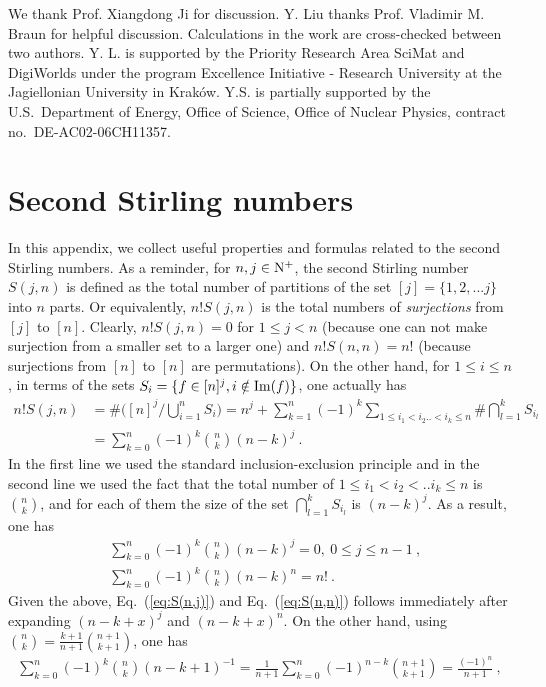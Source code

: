 \documentclass[a4paper,11pt]{article}
\begin{document}
\acknowledgments
We thank Prof. Xiangdong Ji for discussion. Y. Liu thanks Prof. Vladimir M. Braun for helpful discussion.  Calculations in the work are cross-checked between two authors.  Y. L. is supported by the Priority Research Area SciMat and DigiWorlds under the program Excellence Initiative - Research University at the Jagiellonian University in Krak\'{o}w. Y.S. is partially supported by the U.S.~Department of Energy, Office of Science, Office of Nuclear Physics, contract no.~DE-AC02-06CH11357.

\appendix
\section{Second Stirling numbers}\label{sec:stirling}
In this appendix, we collect useful properties and formulas related to the second Stirling numbers. As a reminder, for $n,j \in {\bf \rm N}^+$, the second Stirling number $S(j,n)$ is defined as the total number of partitions of the set $[j]=\{1,2,...j\}$ into $n$ parts. Or equivalently, $n!S(j,n)$ is the total numbers of {\it surjections} from $[j]$ to $[n]$. Clearly, $n!S(j,n)=0$ for $1 \le j<n$ (because one can not make surjection from a smaller set to a larger one) and $n!S(n,n)=n!$ (because surjections from $[n]$ to $[n]$ are permutations). On the other hand, for  $ 1\le i \le n$, in terms of the sets $S_i=\{f \in [n]^j, i\notin {\rm Im}(f)\}$, one actually has
\begin{align}
n!S(j,n)&=\# \bigg([n]^j\bigg /\bigcup_{i=1}^n S_i\bigg)=n^j+\sum_{k=1}^{n}(-1)^k\sum_{1\le i_1<i_2..<i_k\le n}\# \bigcap_{l=1}^k S_{i_l} \nonumber \\ 
&=\sum_{k=0}^n (-1)^k\binom{n}{k}(n-k)^j \ .
\end{align}
In the first line we used the standard inclusion-exclusion principle and in the second line we used the fact that the total number of $1\le i_1<i_2<..i_k\le n$ is $\binom{n}{k}$, and for each of them the size of the set $\bigcap_{l=1}^k S_{i_l}$ is $(n-k)^j$. As a result, one has
\begin{align}
    &\sum_{k=0}^n (-1)^k\binom{n}{k}(n-k)^j=0, \  0 \le j\le n-1 \ , \\ 
    &\sum_{k=0}^n (-1)^k\binom{n}{k}(n-k)^n=n! \ .
\end{align}
Given the above, Eq.~(\ref{eq:S(n,j)}) and Eq.~(\ref{eq:S(n,n)}) follows immediately after expanding $(n-k+x)^j$ and $(n-k+x)^n$. On the other hand, using $\binom{n}{k}=\frac{k+1}{n+1}\binom{n+1}{k+1}$, 
one has
\begin{align}
\sum_{k=0}^{n}(-1)^k \binom{n}{k}(n-k+1)^{-1}=\frac{1}{n+1}\sum_{k=0}^{n}(-1)^{n-k}\binom{n+1}{k+1}=\frac{(-1)^n}{n+1} \ ,
\end{align}
\end{document}
